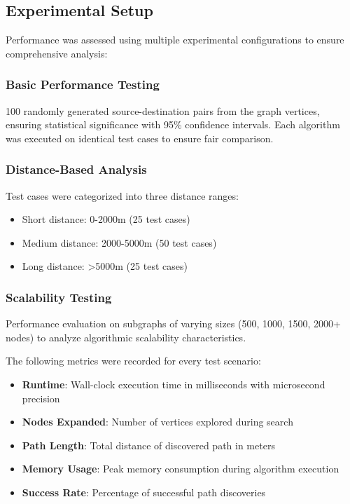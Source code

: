 \documentclass[conference]{IEEEtran}
\begin{document}
\subsection{Experimental Setup}

Performance was assessed using multiple experimental configurations to ensure comprehensive analysis:

\subsubsection{Basic Performance Testing}
100 randomly generated source-destination pairs from the graph vertices, ensuring statistical significance with 95\% confidence intervals. Each algorithm was executed on identical test cases to ensure fair comparison.

\subsubsection{Distance-Based Analysis}
Test cases were categorized into three distance ranges:
\begin{itemize}
\item Short distance: 0-2000m (25 test cases)
\item Medium distance: 2000-5000m (50 test cases)
\item Long distance: >5000m (25 test cases)
\end{itemize}

\subsubsection{Scalability Testing}
Performance evaluation on subgraphs of varying sizes (500, 1000, 1500, 2000+ nodes) to analyze algorithmic scalability characteristics.

The following metrics were recorded for every test scenario:
\begin{itemize}
\item \textbf{Runtime}: Wall-clock execution time in milliseconds with microsecond precision
\item \textbf{Nodes Expanded}: Number of vertices explored during search
\item \textbf{Path Length}: Total distance of discovered path in meters
\item \textbf{Memory Usage}: Peak memory consumption during algorithm execution
\item \textbf{Success Rate}: Percentage of successful path discoveries
\end{itemize}
\end{document}
